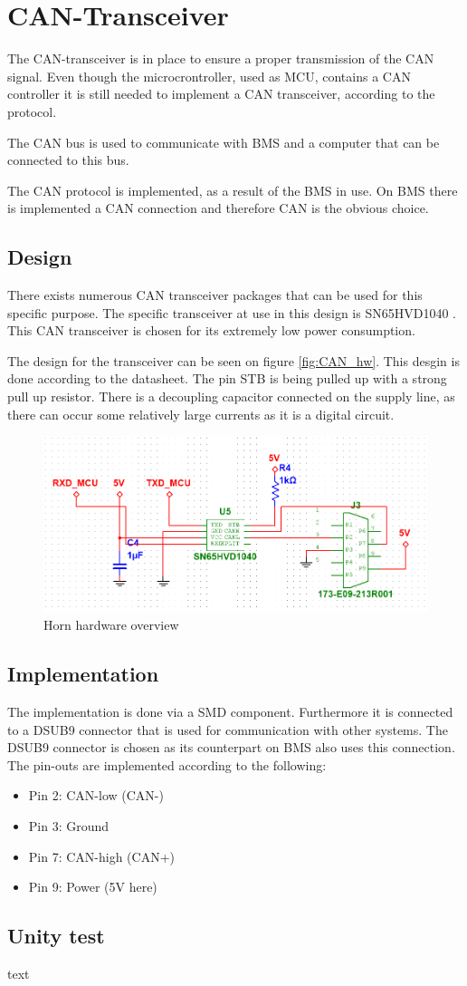 \section{CAN-Transceiver}
The CAN-transceiver is in place to ensure a proper transmission of the CAN signal. Even though the microcrontroller, used as MCU, contains a CAN controller it is still needed to implement a CAN transceiver, according to the protocol.

The CAN bus is used to communicate with BMS and a computer that can be connected to this bus. 

The CAN protocol is implemented, as a result of the BMS in use. On BMS there is implemented a CAN connection and therefore CAN is the obvious choice.    

\subsection{Design}
There exists numerous CAN transceiver packages that can be used for this specific purpose. The specific transceiver at use in this design is SN65HVD1040 . This CAN transceiver is chosen for its extremely low power consumption. 

The design for the transceiver can be seen on figure \vref{fig:CAN_hw}. This desgin is done according to the datasheet. The pin STB is being pulled up with a strong pull up resistor. There is a decoupling capacitor connected on the supply line, as there can occur some relatively large currents as it is a digital circuit. 

\begin{figure}[H]
	\centering
	\includegraphics[width=0.7\linewidth]{Hardware/Pictures/CAN_transceiver}
	\caption{Horn hardware overview}
	\label{fig:CAN_hw}
\end{figure}

\subsection{Implementation}
The implementation is done via a SMD component. Furthermore it is connected to a DSUB9 connector that is used for communication with other systems. The DSUB9 connector is chosen as its counterpart on BMS also uses this connection. The pin-outs are implemented according to the following:

	\begin{itemize}
		\item Pin 2: CAN-low (CAN-)
		\item Pin 3: Ground
		\item Pin 7: CAN-high (CAN+)
		\item Pin 9: Power (5V here)
	\end{itemize} 

\subsection{Unity test}
text